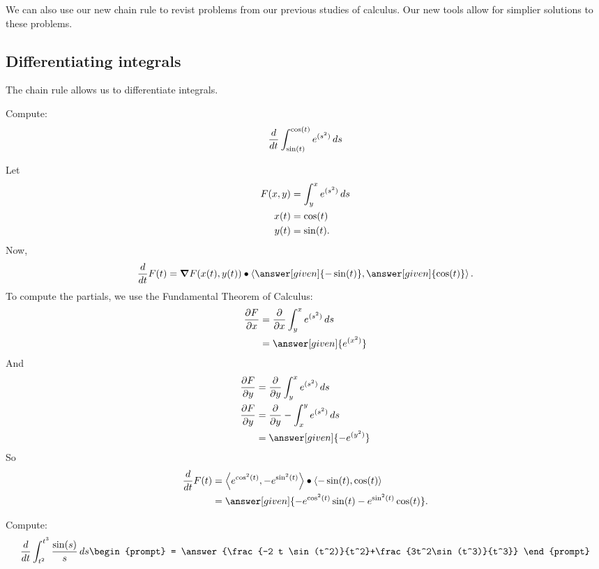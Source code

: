 \documentclass{ximera}
\begin{document}
We can also use our new chain rule to revist problems from our
previous studies of calculus. Our new tools allow for simplier
solutions to these problems.

\subsection{Differentiating integrals}

The chain rule allows us to differentiate integrals.

\begin{example}
  Compute:
  \[
  \frac{\mathop{}\!d }{\mathop{}\!d t} \int_{\sin(t)}^{\cos(t)} e^{(s^2)} \mathop{}\!d s
  \]
  \begin{explanation}
    Let
    \begin{align*}
      F(x,y) &= \int_y^x e^{(s^2)} \mathop{}\!d s\\
      x(t) &= \cos(t)\\
      y(t) &= \sin(t).
    \end{align*}
    Now,
    \[
    \dd{t} F(t) = \grad F(x(t),y(t)) \dotp \vector{\answer[given]{-\sin(t)},\answer[given]{\cos(t)}}.
    \]
    To compute the partials, we use the Fundamental Theorem of Calculus:
    \begin{align*}
    \pp[F]{x} &= \pp{x} \int_y^x e^{(s^2)} \d s\\
    &= \answer[given]{e^{(x^2)}}
    \end{align*}
    And
    \begin{align*}
      \pp[F]{y} &= \pp{y} \int_y^x e^{(s^2)} \d s\\
      \pp[F]{y} &= \pp{y} -\int_x^y e^{(s^2)} \d s\\
      &= \answer[given]{-e^{(y^2)}}
    \end{align*}
    So
    \begin{align*}
      \dd{t} F(t) &= \vector{e^{\cos^2(t)},-e^{\sin^2(t)}}\dotp \vector{-\sin(t),\cos(t)}\\
      &= \answer[given]{-e^{\cos^2(t)}\sin(t)-e^{\sin^2(t)}\cos(t)}.
    \end{align*}
  \end{explanation}
\end{example}


\begin{question}
  Compute:
  \[
  \dd{t} \int_{t^2}^{t^3} \frac{\sin(s)}{s} \d s
  \begin{prompt}
    = \answer{\frac{-2 t \sin(t^2)}{t^2}+\frac{3t^2\sin(t^3)}{t^3}}
  \end{prompt}
  \]
\end{question}
\end{document}
